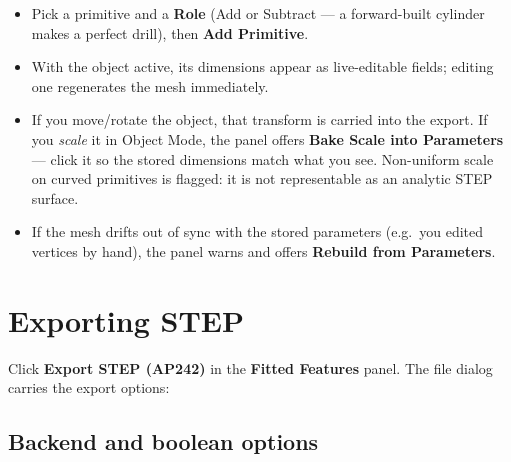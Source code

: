 \documentclass[11pt,a4paper]{article}
\newcommand{\ui}[1]{\textsf{\textbf{#1}}}   %
\begin{document}
\begin{itemize}[nosep]
  \item Pick a primitive and a \ui{Role} (Add or Subtract --- a forward-built
    cylinder makes a perfect drill), then \ui{Add Primitive}.
  \item With the object active, its dimensions appear as live-editable fields;
    editing one regenerates the mesh immediately.
  \item If you move/rotate the object, that transform is carried into the
    export. If you \emph{scale} it in Object Mode, the panel offers
    \ui{Bake Scale into Parameters} --- click it so the stored dimensions match
    what you see. Non-uniform scale on curved primitives is flagged: it is
    not representable as an analytic STEP surface.
  \item If the mesh drifts out of sync with the stored parameters (e.g.\ you
    edited vertices by hand), the panel warns and offers
    \ui{Rebuild from Parameters}.
\end{itemize}

\section{Exporting STEP}
\label{sec:export}

Click \ui{Export STEP (AP242)} in the \ui{Fitted Features} panel. The file
dialog carries the export options:

\subsection{Backend and boolean options}
\end{document}
